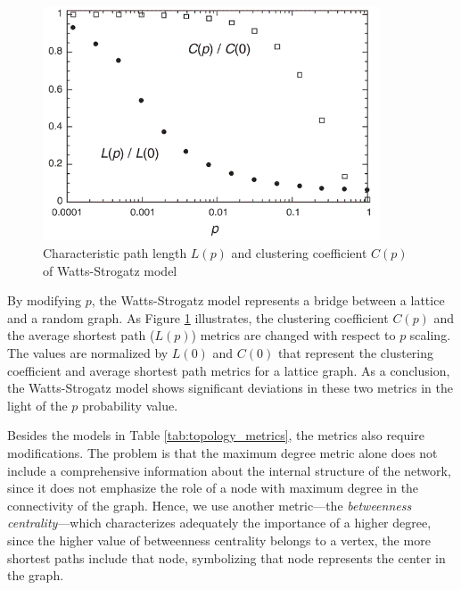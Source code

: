 \begin{figure}[!ht]
	\centering
	\includegraphics[width=100mm, keepaspectratio]{figures/ws_metrics.png}
	\caption{Characteristic path length $L(p)$ and clustering coefficient $C(p)$ of Watts-Strogatz model~\cite{ws_metrics}}
	\label{fig:ws}
\end{figure}

By modifying $p$, the Watts-Strogatz model represents a bridge between a lattice and a random graph. As Figure \ref{fig:ws} illustrates, the clustering coefficient $C(p)$ and the average shortest path ($L(p)$) metrics are changed with respect to $p$ scaling. The values are normalized by $L(0)$ and $C(0)$ that represent the clustering coefficient and average shortest path metrics for a lattice graph. As a conclusion, the Watts-Strogatz model shows significant deviations in these two metrics in the light of the $p$ probability value. 

Besides the models in Table \ref{tab:topology_metrics}, the metrics also require modifications. The problem is that the maximum degree metric alone does not include a comprehensive information about the internal structure of the network, since it does not emphasize the role of a node with maximum degree in the connectivity of the graph. Hence, we use another metric---the \textit{betweenness centrality}---which characterizes adequately the importance of a higher degree, since the higher value of betweenness centrality belongs to a vertex, the more shortest paths include that node, symbolizing that node represents the center in the graph.


